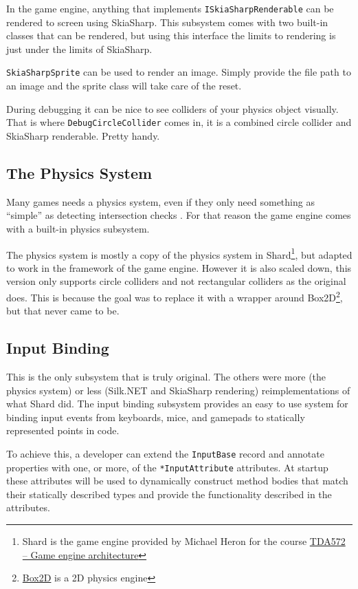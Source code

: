 \documentclass{article}
\newcommand{\zarya}{the game engine}
\begin{document}
In \zarya{}, anything that implements \texttt{ISkiaSharpRenderable} can be rendered to screen using SkiaSharp.
This subsystem comes with two built-in classes that can be rendered, but using this interface the limits to rendering is just under the limits of SkiaSharp.

\texttt{SkiaSharpSprite} can be used to render an image. Simply provide the file path to an image and the sprite class will take care of the reset.

During debugging it can be nice to see colliders of your physics object visually. That is where \texttt{DebugCircleCollider} comes in, it is a combined circle collider and SkiaSharp renderable. Pretty handy.

\subsection*{The Physics System}

Many games needs a physics system, even if they only need something as ``simple'' as detecting intersection checks \cite{MH22}.
For that reason \zarya{} comes with a built-in physics subsystem.

The physics system is mostly a copy of the physics system in Shard\footnote{Shard is the game engine provided by Michael Heron for the course \href{https://student.portal.chalmers.se/en/chalmersstudies/courseinformation/Pages/SearchCourse.aspx?course_id=24182&parsergrp=3}{TDA572 -- Game engine architecture}}, but adapted to work in the framework of \zarya{}.
However it is also scaled down, this version only supports circle colliders and not rectangular colliders as the original does.
This is because the goal was to replace it with a wrapper around Box2D\footnote{\href{https://box2d.org/}{Box2D} is a 2D physics engine}, but that never came to be.

\subsection*{Input Binding}

This is the only subsystem that is truly original.
The others were more (the physics system) or less (Silk.NET and SkiaSharp rendering) reimplementations of what Shard did.
The input binding subsystem provides an easy to use system for binding input events from keyboards, mice, and gamepads to statically represented points in code.

To achieve this, a developer can extend the \texttt{InputBase} record and annotate properties with one, or more, of the \texttt{*InputAttribute} attributes.
At startup these attributes will be used to dynamically construct method bodies that match their statically described types and provide the functionality described in the attributes.
\end{document}
